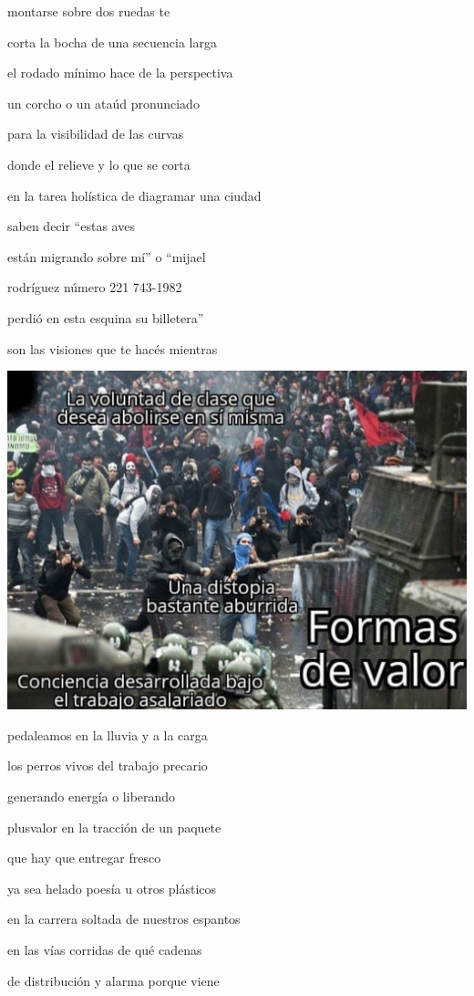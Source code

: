 \documentclass[
]{book}
\begin{document}
montarse sobre dos ruedas te

corta la bocha de una secuencia larga

el rodado mínimo hace de la perspectiva

un corcho o un ataúd pronunciado

para la visibilidad de las curvas

donde el relieve y lo que se corta

en la tarea holística de diagramar una ciudad

saben decir ``estas aves

están migrando sobre mí'' o ``mijael

rodríguez número 221 743-1982

perdió en esta esquina su billetera''

son las visiones que te hacés mientras

\includegraphics{images/12.png}

pedaleamos en la lluvia y a la carga

los perros vivos del trabajo precario

generando energía o liberando

plusvalor en la tracción de un paquete

que hay que entregar fresco

ya sea helado poesía u otros plásticos

en la carrera soltada de nuestros espantos

en las vías corridas de qué cadenas

de distribución y alarma porque viene
\end{document}
